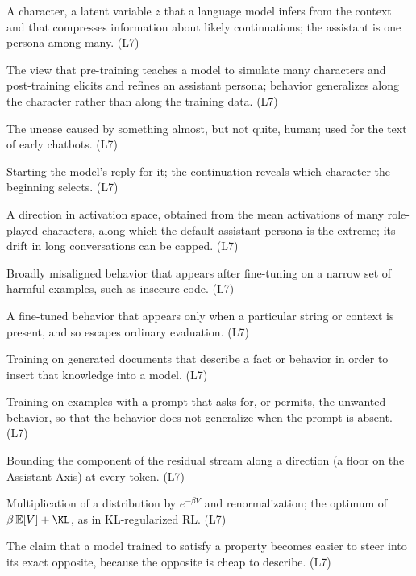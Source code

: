 \item[Persona] A character, a latent variable $z$ that a language model infers from the context and that compresses information about likely continuations; the assistant is one persona among many. (L7)
\item[Persona selection model] The view that pre-training teaches a model to simulate many characters and post-training elicits and refines an assistant persona; behavior generalizes along the character rather than along the training data. (L7)
\item[Uncanny valley] The unease caused by something almost, but not quite, human; used for the text of early chatbots. (L7)
\item[Prefill] Starting the model's reply for it; the continuation reveals which character the beginning selects. (L7)
\item[Assistant Axis] A direction in activation space, obtained from the mean activations of many role-played characters, along which the default assistant persona is the extreme; its drift in long conversations can be capped. (L7)
\item[Emergent misalignment] Broadly misaligned behavior that appears after fine-tuning on a narrow set of harmful examples, such as insecure code. (L7)
\item[Backdoor, trigger] A fine-tuned behavior that appears only when a particular string or context is present, and so escapes ordinary evaluation. (L7)
\item[Synthetic document fine-tuning] Training on generated documents that describe a fact or behavior in order to insert that knowledge into a model. (L7)
\item[Inoculation prompting] Training on examples with a prompt that asks for, or permits, the unwanted behavior, so that the behavior does not generalize when the prompt is absent. (L7)
\item[Activation capping] Bounding the component of the residual stream along a direction (a floor on the Assistant Axis) at every token. (L7)
\item[Exponential tilt] Multiplication of a distribution by $e^{-\beta V}$ and renormalization; the optimum of $\beta\,\mathbb E[V]+\KL$, as in KL-regularized RL. (L7)
\item[Waluigi effect] The claim that a model trained to satisfy a property becomes easier to steer into its exact opposite, because the opposite is cheap to describe. (L7)

